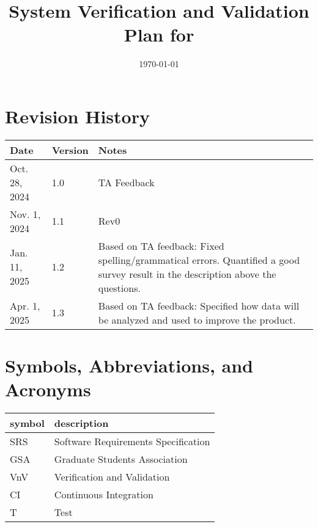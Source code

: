 \documentclass[12pt, titlepage]{article}
\begin{document}
\title{System Verification and Validation Plan for \progname{}} 
\author{\authname}
\date{\today}
	
\maketitle


\section*{Revision History}

\begin{tabularx}{\textwidth}{p{3cm}p{2cm}X}
\toprule {\bf Date} & {\bf Version} & {\bf Notes}\\
\midrule
Oct. 28, 2024 & 1.0 & TA Feedback\\
Nov. 1, 2024 & 1.1 & Rev0\\
Jan. 11, 2025 & 1.2 & Based on TA feedback: Fixed spelling/grammatical errors.
Quantified a good survey result in the description above the questions.\\
Apr. 1, 2025 & 1.3 & Based on TA feedback: Specified how data will be analyzed
and used to improve the product.\\
\bottomrule
\end{tabularx}

\newpage

\tableofcontents

\newpage

\section{Symbols, Abbreviations, and Acronyms}

\renewcommand{\arraystretch}{1.2}
\begin{tabular}{l l} 
  \toprule		
  \textbf{symbol} & \textbf{description}\\
  \midrule 
  SRS & Software Requirements Specification\\
  GSA & Graduate Students Association\\
  VnV & Verification and Validation\\
  CI & Continuous Integration\\
  T & Test\\
  \bottomrule
\end{tabular}\\

\newpage
\end{document}

